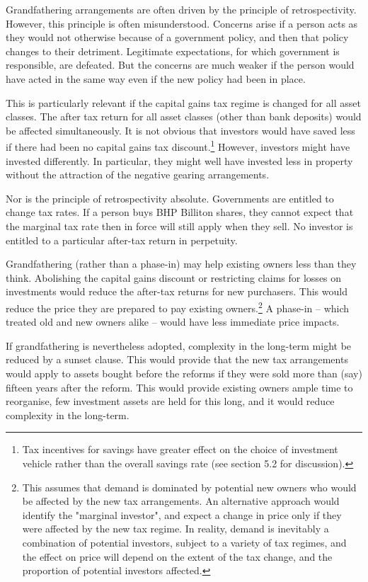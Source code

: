 \documentclass{grattan}\usepackage[]{graphicx}\usepackage[]{color}
\begin{document}
Grandfathering arrangements are often driven by the principle of retrospectivity. However, this principle is often misunderstood. Concerns arise if a person acts as they would not otherwise because of a government policy, and then that policy changes to their detriment. Legitimate expectations, for which government is responsible, are defeated. But the concerns are much weaker if the person would have acted in the same way even if the new policy had been in place.

This is particularly relevant if the capital gains tax regime is changed for all asset classes. The after tax return for all asset classes (other than bank deposits) would be affected simultaneously. It is not obvious that investors would have saved less if there had been no capital gains tax discount.\footnote{Tax incentives for savings have greater effect on the choice of investment vehicle rather than the overall savings rate (see section 5.2 for discussion).} However, investors might have invested differently. In particular, they might well have invested less in property without the attraction of the negative gearing arrangements. 

Nor is the principle of retrospectivity absolute. Governments are entitled to change tax rates. If a person buys BHP Billiton shares, they cannot expect that the marginal tax rate then in force will still apply when they sell. No investor is entitled to a particular after-tax return in perpetuity.

Grandfathering (rather than a phase-in) may help existing owners less than they think. Abolishing the capital gains discount or restricting claims for losses on investments would reduce the after-tax returns for new purchasers. This would reduce the price they are prepared to pay existing owners.\footnote{This assumes that demand is dominated by potential new owners who would be affected by the new tax arrangements. An alternative approach would identify the "marginal investor", and expect a change in price only if they were affected by the new tax regime. In reality, demand is inevitably a combination of potential investors, subject to a variety of tax regimes, and the effect on price will depend on the extent of the tax change, and the proportion of potential investors affected.} A phase-in -- which treated old and new owners alike -- would have less immediate price impacts.

If grandfathering is nevertheless adopted, complexity in the long-term might be reduced by a sunset clause. This would provide that the new tax arrangements would apply to assets bought before the reforms if they were sold more than (say) fifteen years after the reform. This would provide existing owners ample time to reorganise, few investment assets are held for this long, and it would reduce complexity in the long-term.
\end{document}
